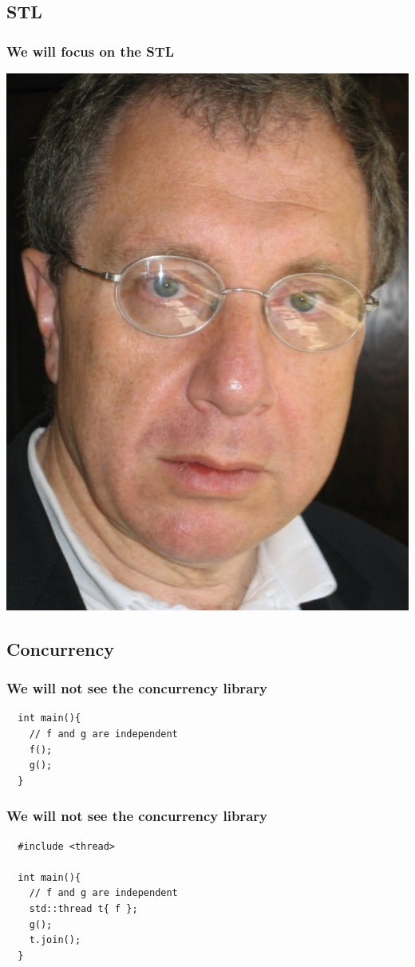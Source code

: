 \subsection{STL}
\begin{frame}
  \frametitle{We will focus on the STL \smiley}
  \centering
  \includegraphics[height=0.7\textheight]{img/alex.jpg}
\end{frame}
\subsection{Concurrency}
\begin{frame}[fragile]
  \frametitle{We will not see the concurrency library \frownie }
\begin{lstlisting}
  int main(){
    // f and g are independent
    f();
    g();
  }
\end{lstlisting}
\end{frame}

\begin{frame}[fragile]
  \frametitle{We will not see the concurrency library  \frownie }
\begin{lstlisting}
  #include <thread>
    
  int main(){
    // f and g are independent
    std::thread t{ f };
    g();
    t.join();
  }
\end{lstlisting}

\end{frame}



